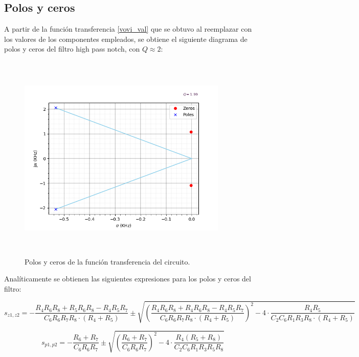 \subsection{Polos y ceros}


A partir de la funci\'on transferencia \ref{vovi_val} que se obtuvo al reemplazar con los valores de los componentes empleados, se obtiene el siguiente diagrama de polos y ceros del filtro high pass notch, con $Q\approx 2$:

\begin{figure}[H] %
	\centering
	\includegraphics[width=10cm,height=10cm,keepaspectratio]{../EJ1/00GRAFICOS/singularidades.png}
	\caption{Polos y ceros de la funci\'on transferencia del circuito.}
	\label{c1vinmax}
\end{figure}


Anal\'iticamente se obtienen las siguientes expresiones para los polos y ceros del filtro:

\begin{equation}
s_{z1,z2} = - \frac{R_4  R_6  R_8+R_5  R_6  R_8 - R_4 R_5 R_7}{C_6 R_6 R_7 R_8 \cdot (R_4 + R_5)} \pm \sqrt{\left( \frac{R_4 R_6 R_8 + R_4 R_6 R_8 - R_4 R_5 R_7}{C_6 R_6 R_7 R_8 \cdot (R_4 + R_5)}\right)^2- 4 \cdot \frac{R_4 R_5}{C_2 C_6 R_1 R_3 R_8 \cdot (R_4 + R_5)}}
\label{ceros}
\end{equation}

\begin{equation}
s_{p1,p2} = - \frac{R_6 + R_7}{C_6 R_6 R_7} \pm \sqrt{\left( \frac{R_6 + R_7}{C_6 R_6 R_7}\right)^2 - 4 \cdot \frac{R_4(R_5+R_8)}{C_2 C_6 R_1 R_3 R_5 R_8}}
\label{polos}
\end{equation}



